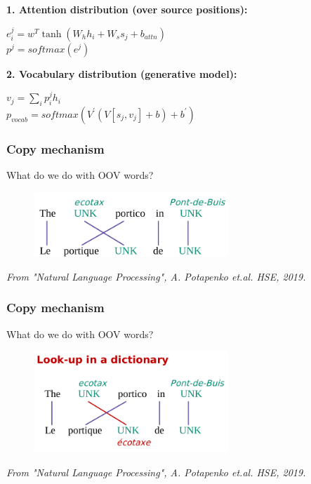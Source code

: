 \documentclass{tum-presentation}
\begin{document}
\begin{frame}
		\huge \textbf{\textcolor{TUMBlau}{1. Attention distribution (over source positions):}}
		\vskip 0.2in
		\begin{center}
			$e_i^j = w^T \tanh(W_h h_i + W_s s_j + b_{attn})$ \\
			\vskip 0.2in
			$p^{j} = softmax(e^j)$
		\end{center}
		\vskip 0.2in
		\textbf{\textcolor{TUMBlau}{2. Vocabulary distribution (generative model):}}
		\begin{center}
			$v_j = \sum_{i} p_i^j h_i$ \\
			\vskip 0.2in
			$p_{vocab} = softmax(V^{'}(V[s_j, v_j] + b) + b^{'})$
		\end{center}
		\vskip 0.2in	
\end{frame}

\begin{frame}
	\frametitle{Copy mechanism}
	\huge What do we do with OOV words?
	\begin{figure}
		\centering
		\includegraphics[width=0.65\textwidth,keepaspectratio=true]{tum-resources/images/copy_mech_1.png}
		\label{fig:copy_mech_1}
	\end{figure}
	\begin{flushright}
	\small \textit{	From "Natural Language Processing", A. Potapenko et.al. HSE, 2019. }
	\end{flushright}
\end{frame}

\begin{frame}
	\frametitle{Copy mechanism}
	\huge What do we do with OOV words?
	\begin{figure}
		\centering
		\includegraphics[width=0.65\textwidth,keepaspectratio=true]{tum-resources/images/copy_mech_2.png}
		\label{fig:copy_mech_2}
	\end{figure}
	\begin{flushright}
	\small \textit{	From "Natural Language Processing", A. Potapenko et.al. HSE, 2019. }
	\end{flushright}
\end{frame}
\end{document}

